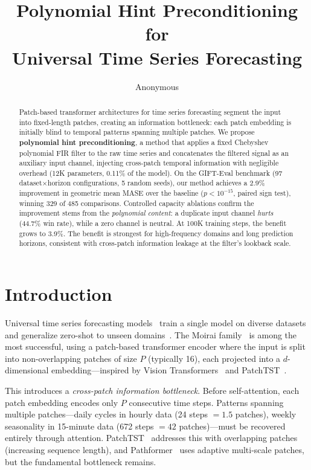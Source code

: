 \documentclass[letterpaper]{article}
\title{\Large\textbf{Polynomial Hint Preconditioning for\\Universal Time Series Forecasting}}
\author{Anonymous}
\date{}
\begin{document}
\maketitle

\begin{abstract}
\noindent
Patch-based transformer architectures for time series forecasting segment the input into fixed-length patches, creating an information bottleneck: each patch embedding is initially blind to temporal patterns spanning multiple patches. We propose \textbf{polynomial hint preconditioning}, a method that applies a fixed Chebyshev polynomial FIR filter to the raw time series and concatenates the filtered signal as an auxiliary input channel, injecting cross-patch temporal information with negligible overhead (12K parameters, 0.11\% of the model). On the GIFT-Eval benchmark (97 dataset$\times$horizon configurations, 5 random seeds), our method achieves a 2.9\% improvement in geometric mean MASE over the baseline ($p < 10^{-15}$, paired sign test), winning 329 of 485 comparisons. Controlled capacity ablations confirm the improvement stems from the \emph{polynomial content}: a duplicate input channel \emph{hurts} (44.7\% win rate), while a zero channel is neutral. At 100K training steps, the benefit grows to 3.9\%. The benefit is strongest for high-frequency domains and long prediction horizons, consistent with cross-patch information leakage at the filter's lookback scale.
\end{abstract}

\section{Introduction}

Universal time series forecasting models~\citep{woo2024unified,das2024decoder,ansari2024chronos,rasul2024lagllama,goswami2024moment} train a single model on diverse datasets and generalize zero-shot to unseen domains~\citep{liang2024foundation}. The Moirai family~\citep{woo2024unified,liu2024moirai2} is among the most successful, using a patch-based transformer encoder where the input is split into non-overlapping patches of size $P$ (typically 16), each projected into a $d$-dimensional embedding---inspired by Vision Transformers~\citep{dosovitskiy2021image} and PatchTST~\citep{nie2023patchtst}.

This introduces a \emph{cross-patch information bottleneck}. Before self-attention, each patch embedding encodes only $P$ consecutive time steps. Patterns spanning multiple patches---daily cycles in hourly data (24 steps $= 1.5$ patches), weekly seasonality in 15-minute data (672 steps $= 42$ patches)---must be recovered entirely through attention. PatchTST~\citep{nie2023patchtst} addresses this with overlapping patches (increasing sequence length), and Pathformer~\citep{zhang2024crossformer} uses adaptive multi-scale patches, but the fundamental bottleneck remains.
\end{document}
